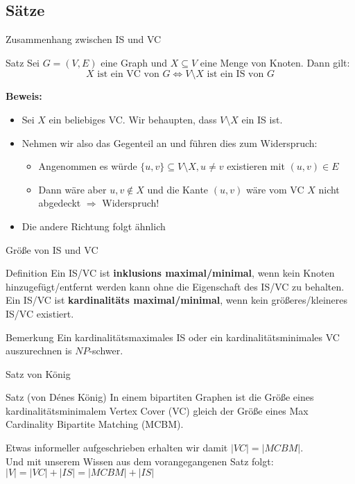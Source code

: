 \subsection{Sätze}
\begin{frame}{Zusammenhang zwischen IS und VC}
	\begin{block}{Satz}
		Sei $G=(V,E)$ eine Graph und $X\subseteq V$ eine Menge von Knoten. Dann gilt:
		\[X\text{ ist ein VC von $G$} \Longleftrightarrow V\setminus X\text{ ist ein IS von $G$}\]
	\end{block}
	\pause
	\textbf{Beweis:}
	\begin{itemize}
		\item Sei $X$ ein beliebiges VC. Wir behaupten, dass $V\setminus X$ ein IS ist.
		\item Nehmen wir also das Gegenteil an und führen dies zum Widerspruch:
		\pause
		\begin{itemize}
			\item Angenommen es würde $\{u,v\}\subseteq V\setminus X, u\neq v$ existieren mit $(u,v)\in E$
			\item Dann wäre aber $u,v\notin X$ und die Kante $(u,v)$ wäre vom VC $X$ nicht abgedeckt $\Rightarrow$ Widerspruch!
		\end{itemize}
		\pause
		\item Die andere Richtung folgt ähnlich
	\end{itemize}
\end{frame}
\begin{frame}{Größe von IS und VC}
	\begin{block}{Definition}
		Ein IS/VC ist \textbf{inklusions maximal/minimal}, wenn kein Knoten hinzugefügt/entfernt werden kann ohne die Eigenschaft des IS/VC zu behalten.\\
		\pause
		Ein IS/VC ist \textbf{kardinalitäts maximal/minimal}, wenn kein größeres/kleineres IS/VC existiert.
	\end{block}
	\pause
	\begin{block}{Bemerkung}
		Ein kardinalitätsmaximales IS oder ein kardinalitätsminimales VC auszurechnen is $NP$-schwer.
	\end{block}
\end{frame}
\begin{frame}{Satz von König}
	\begin{block}{Satz (von Dénes König)}
		In einem bipartiten Graphen ist die Größe eines kardinalitätsminimalem Vertex Cover (VC) gleich der Größe eines Max Cardinality Bipartite Matching (MCBM).
	\end{block}
	\pause
	Etwas informeller aufgeschrieben erhalten wir damit $|VC| = |MCBM|$.\\
	Und mit unserem Wissen aus dem vorangegangenen Satz folgt: $|V| = |VC| + |IS| = |MCBM| + |IS|$\\
\end{frame}

